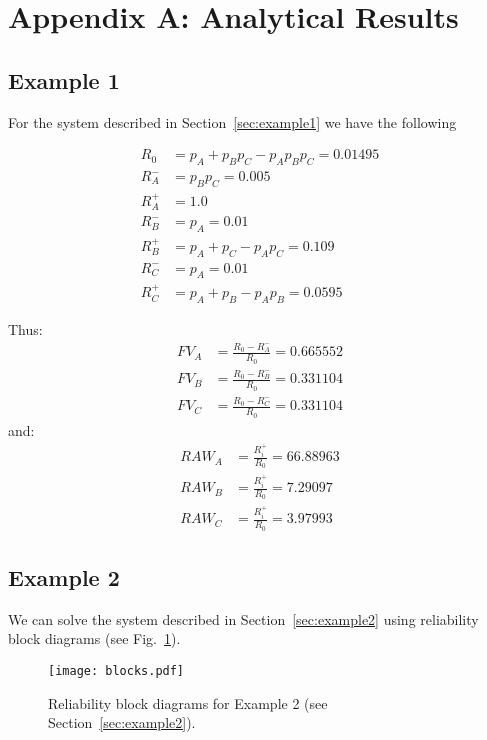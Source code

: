 \section*{Appendix A: Analytical Results}
\label{sec:appendixA}

\subsection*{Example 1}
\label{sec:example1Anal}

For the system described in Section~\ref{sec:example1} we have the following

\begin{align} 
  R_0   &= p_A + p_B p_C - p_A p_B p_C = 0.01495   \\
  R_A^- &= p_B p_C = 0.005  \\
  R_A^+ &= 1.0  \\
  R_B^- &= p_A = 0.01  \\
  R_B^+ &= p_A + p_C - p_A p_C = 0.109  \\
  R_C^- &= p_A = 0.01 \\
  R_C^+ &= p_A + p_B - p_A p_B = 0.0595  
\end{align}

Thus:
\begin{align} 
  FV_A &= \frac{R_0-R_A^-}{R_0} = 0.665552 \\
  FV_B &= \frac{R_0-R_B^-}{R_0} = 0.331104 \\
  FV_C &= \frac{R_0-R_C^-}{R_0} = 0.331104    
\end{align}
and:
\begin{align} 
  RAW_A &= \frac{R_i^+}{R_0} = 66.88963 \\
  RAW_B &= \frac{R_i^+}{R_0} = 7.29097 \\
  RAW_C &= \frac{R_i^+}{R_0} = 3.97993    
\end{align}

\subsection*{Example 2}
\label{sec:example2Anal}

We can solve the system described in Section~\ref{sec:example2} using reliability
block diagrams (see Fig.~\ref{fig:example12}).

\begin{figure}
    \centering
    \texttt{[image: blocks.pdf]}
    \caption{Reliability block diagrams for Example 2 (see Section~\ref{sec:example2}).}
    \label{fig:example12}
\end{figure}

